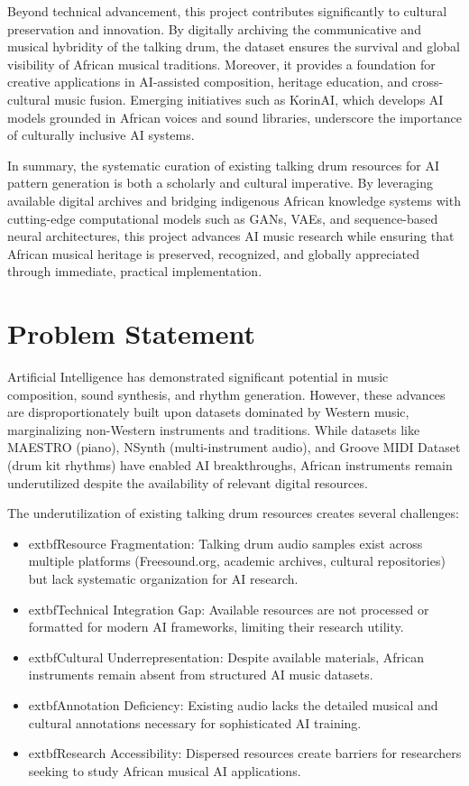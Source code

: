 \documentclass[12pt,a4paper]{article}
\begin{document}
Beyond technical advancement, this project contributes significantly to cultural preservation and innovation. By digitally archiving the communicative and musical hybridity of the talking drum, the dataset ensures the survival and global visibility of African musical traditions. Moreover, it provides a foundation for creative applications in AI-assisted composition, heritage education, and cross-cultural music fusion. Emerging initiatives such as KorinAI, which develops AI models grounded in African voices and sound libraries, underscore the importance of culturally inclusive AI systems.

In summary, the systematic curation of existing talking drum resources for AI pattern generation is both a scholarly and cultural imperative. By leveraging available digital archives and bridging indigenous African knowledge systems with cutting-edge computational models such as GANs, VAEs, and sequence-based neural architectures, this project advances AI music research while ensuring that African musical heritage is preserved, recognized, and globally appreciated through immediate, practical implementation.

\section{Problem Statement}

Artificial Intelligence has demonstrated significant potential in music composition, sound synthesis, and rhythm generation. However, these advances are disproportionately built upon datasets dominated by Western music, marginalizing non-Western instruments and traditions. While datasets like MAESTRO (piano), NSynth (multi-instrument audio), and Groove MIDI Dataset (drum kit rhythms) have enabled AI breakthroughs, African instruments remain underutilized despite the availability of relevant digital resources.

The underutilization of existing talking drum resources creates several challenges:

\begin{itemize}
\item 	extbf{Resource Fragmentation:} Talking drum audio samples exist across multiple platforms (Freesound.org, academic archives, cultural repositories) but lack systematic organization for AI research.
\item 	extbf{Technical Integration Gap:} Available resources are not processed or formatted for modern AI frameworks, limiting their research utility.
\item 	extbf{Cultural Underrepresentation:} Despite available materials, African instruments remain absent from structured AI music datasets.
\item 	extbf{Annotation Deficiency:} Existing audio lacks the detailed musical and cultural annotations necessary for sophisticated AI training.
\item 	extbf{Research Accessibility:} Dispersed resources create barriers for researchers seeking to study African musical AI applications.
\end{itemize}
\end{document}
